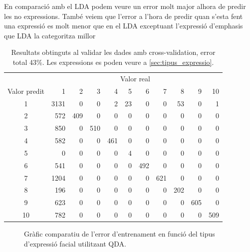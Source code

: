 \documentclass[a4paper]{article}
\begin{document}
En comparació amb el LDA podem veure un error molt major alhora de predir les no expressions. També veiem que l’error a l’hora de predir quan s’esta fent una expressió es molt menor que en el LDA exceptuant l’expressió d’emphasis que LDA la categoritza millor

\begin{table}[H]
	\centering
	\def\arraystretch{1.2}
	\begin{tabular}{|c|rrrrrrrrrr|}
		\hline
		& \multicolumn{10}{c|}{Valor real} \\
		Valor predit & 1 & 2 & 3 & 4 & 5 & 6 & 7 & 8 & 9 & 10 \\
		\hline
		1 & 3131 & 0 & 0 & 2 & 23 & 0 & 0 & 53 & 0 & 1 \\
		2 & 572 & 409 & 0 & 0 & 0 & 0 & 0 & 0 & 0 & 0 \\
		3 & 850 & 0 & 510 & 0 & 0 & 0 & 0 & 0 & 0 & 0 \\
		4 & 582 & 0 & 0 & 461 & 0 & 0 & 0 & 0 & 0 & 0 \\
		5 & 0 & 0 & 0 & 0 & 4 & 0 & 0 & 0 & 0 & 0 \\
		6 & 541 & 0 & 0 & 0 & 0 & 492 & 0 & 0 & 0 & 0 \\
		7 & 1204 & 0 & 0 & 0 & 0 & 0 & 621 & 0 & 0 & 0 \\
		8 & 196 & 0 & 0 & 0 & 0 & 0 & 0 & 202 & 0 & 0 \\
		9 & 623 & 0 & 0 & 0 & 0 & 0 & 0 & 0 & 605 & 0 \\
		10 & 782 & 0 & 0 & 0 & 0 & 0 & 0 & 0 & 0 & 509 \\
		\hline
	\end{tabular}
	\captionsetup{width=0.8\textwidth}
	\caption{Resultats obtinguts al validar les dades amb cross-validation, error total 43\%. Les expressions es poden veure a \autoref{sec:tipus_expressio}.}
\end{table}

\begin{figure}[H]
	\centering
	\captionsetup{width=0.8\textwidth}
	\caption{Gràfic comparatiu de l'error d'entrenament en funció del tipus d'expressió facial utilitzant QDA.}
\end{figure}
\end{document}
